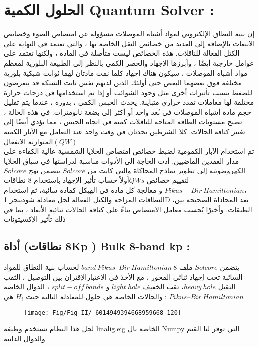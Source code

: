 \section{ الحلول الكمية Quantum Solver :}
إن بنية النطاق الإلكتروني لمواد أشباه الموصلات مسؤولة عن امتصاص الضوء وخصائص الانبعاث بالإضافة إلى العديد من خصائص النقل الخاصة بها ، والتي تعتمد في النهاية على الكتل الفعالة للناقلات. هذه الخصائص ليست متأصلة في المادة ، ولكنها تعتمد على عوامل خارجية أيضًا ، وأبرزها الإجهاد والحصر الكمي
بالنظر إلى الطبيعة البلورية لمعظم مواد أشباه الموصلات ، سيكون هناك إجهاد كلما نمت مادتان لهما ثوابت شبكية بلورية مختلفة فوق بعضهما البعض  حتى أولئك الذين لديهم نفس ثابت الشبكة قد يتعرضون للضغط بسبب تأثيرات أخرى مثل وجود الشوائب أو إذا تم استخدامها في درجات حرارة مختلفة لها معاملات تمدد حراري متباينة. يحدث الحبس الكمي ، بدوره ، عندما يتم تقليل حجم مادة أشباه الموصلات في بُعد واحد أو أكثر إلى بضعة نانومترات. في هذه الحالة ، تصبح مستويات الطاقة المتاحة للناقلات كمية في اتجاه الحبس ، مما يؤدي أيضًا إلى تغيير كثافة الحالات. كلا الشرطين يحدثان في وقت واحد عند التعامل مع الآبار الكمية المتوازنة الانفعال$  (QW) $ \\
تم استخدام الآبار الكمومية لضبط خصائص امتصاص الخلايا الشمسية عالية الكفاءة على مدار العقدين الماضيين. أدت الحاجة إلى الأدوات مناسبة لدراستها في سياق  الخلايا الكهروضوئية إلى تطوير نماذج المحاكاة   والتي كانت من  $ Solcore  $
يتضمن نهج $ Solcore  $لتقييم خصائص $ QWs  $أولاً حساب تأثير الإجهاد  باستخدام 8 نطاقات $ Pikus-Bir~ Hamiltonian ، $ و معالجة كل مادة في الهيكل كمادة سائبة، ثم استخدام النطاقات المزاحة والكتل الفعالة لحل معادلة شودينجر 1D ،بعد المحاذاة الصحيحة بين الطبقات. وأخيرًا يُحسب معامل الامتصاص بناءً على كثافة الحالات ثنائية الأبعاد ، بما في ذلك تأثير الإكسيتونات
\subsection{  أداة  (8 نطاقاتKp ) Bulk 8-band kp :  }
يتضمن $ Solcore  $ ملف $ band ~Pikus–Bir~ Hamiltonian~  8  $ لحساب بنية النطاق للمواد السائبة تحت إجهاد ثنائي المحور ، مع الأخذ في الاعتبارالإقتران بين  التوصيل ، الثقب الثقيل $ heavy~ hole   $، ثقب  الخفيف $ light~ hole  $ و $ split-off~ bands  $ ، الدوال الخاصة والحالات الخاصة هي حلول للمعادلة التالية حيث  
$ H_i $
هي :
$ Pikus–Bir ~Hamiltonian   $
\begin{figure}[h!]
	\centering
	\texttt{[image: Fig/Fig\_II/-6014949394668959668\_120]}
	\caption{}
	\label{fig:-6014949394668959668120}
\end{figure}
\FloatBarrier
لحل هذا النظام نستخدم وظيفة linalig.eig الخاصة بال Numpy التي توفر لنا القيم والدوال الذاتية
